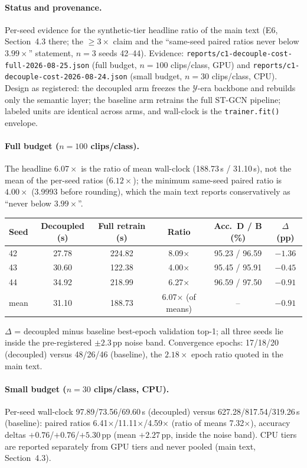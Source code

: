 \documentclass[11pt,a4paper]{article}
\begin{document}
\paragraph{Status and provenance.}
Per-seed evidence for the synthetic-tier headline ratio of the main text (E6, Section~4.3 there; the $\geq 3\times$ claim and the ``same-seed paired ratios never below $3.99\times$'' statement, $n{=}3$ seeds 42--44). Evidence: \texttt{reports/c1-decouple-cost-full-2026-08-25.json} (full budget, $n{=}100$ clips/class, GPU) and \texttt{reports/c1-decouple-cost-2026-08-24.json} (small budget, $n{=}30$ clips/class, CPU). Design as registered: the decoupled arm freezes the $\mathcal{Y}$-era backbone and rebuilds only the semantic layer; the baseline arm retrains the full ST-GCN pipeline; labeled units are identical across arms, and wall-clock is the \texttt{trainer.fit()} envelope.

\paragraph{Full budget ($n{=}100$ clips/class).}
The headline $6.07\times$ is the ratio of mean wall-clock (188.73\,s / 31.10\,s), not the mean of the per-seed ratios ($6.12\times$); the minimum same-seed paired ratio is $4.00\times$ (3.9993 before rounding), which the main text reports conservatively as ``never below $3.99\times$''.
\begin{center}
\begin{tabular}{lccccc}
\toprule
Seed & Decoupled (s) & Full retrain (s) & Ratio & Acc.\ D / B (\%) & $\Delta$ (pp) \\
\midrule
42 & 27.78 & 224.82 & 8.09$\times$ & 95.23 / 96.59 & $-1.36$ \\
43 & 30.60 & 122.38 & 4.00$\times$ & 95.45 / 95.91 & $-0.45$ \\
44 & 34.92 & 218.99 & 6.27$\times$ & 96.59 / 97.50 & $-0.91$ \\
\midrule
mean & 31.10 & 188.73 & 6.07$\times$ (of means) & -- & $-0.91$ \\
\bottomrule
\end{tabular}
\end{center}
$\Delta$ = decoupled minus baseline best-epoch validation top-1; all three seeds lie inside the pre-registered $\pm 2.3$\,pp noise band. Convergence epochs: 17/18/20 (decoupled) versus 48/26/46 (baseline), the $2.18\times$ epoch ratio quoted in the main text.

\paragraph{Small budget ($n{=}30$ clips/class, CPU).}
Per-seed wall-clock 97.89/73.56/69.60\,s (decoupled) versus 627.28/817.54/319.26\,s (baseline): paired ratios 6.41$\times$/11.11$\times$/4.59$\times$ (ratio of means 7.32$\times$), accuracy deltas $+0.76$/$+0.76$/$+5.30$\,pp (mean $+2.27$\,pp, inside the noise band). CPU tiers are reported separately from GPU tiers and never pooled (main text, Section~4.3).
\end{document}
